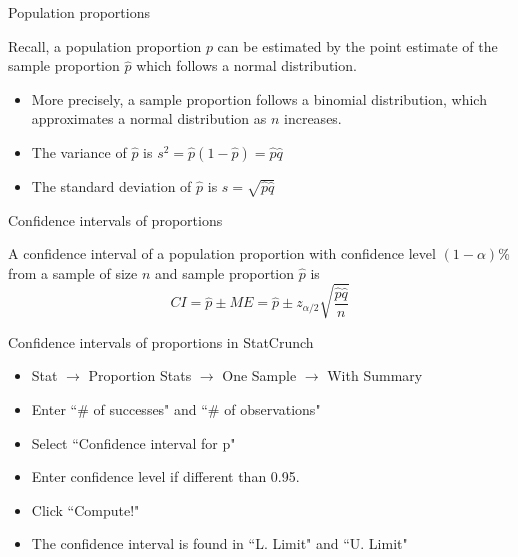 \documentclass[xcolor=table, handout]{beamer}
\begin{document}
\begin{frame}{Population proportions}
\begin{block}{}
\large
Recall, a population proportion $p$ can be estimated by the point estimate of the sample proportion $\hat p$ which follows a normal distribution.
\begin{itemize}
\pause\item More precisely, a sample proportion follows a binomial distribution, which approximates a normal distribution as $n$ increases.
\pause\item The variance of $\hat p$ is $s^2 = \hat p (1-\hat p) = \hat p \hat q$
\pause\item The standard deviation of $\hat p$ is $s = \sqrt{\hat p \hat q}$
\end{itemize}
\end{block}
\end{frame}

\begin{frame}{Confidence intervals of proportions}
\begin{block}{}
\large
A confidence interval of a population proportion with confidence level $(1-\alpha)$\% from a sample of size $n$ and sample proportion $\hat p$ is
\[CI = \hat p \pm ME = \hat p \pm z_{\alpha/2} \sqrt{\frac {\hat p \hat q}{n}}\]
\end{block}
\end{frame}

\begin{frame}{Confidence intervals of proportions in StatCrunch}
\begin{block}{}
\begin{itemize}
\item Stat $\to$ Proportion Stats $\to$ One Sample $\to$ With Summary
\item Enter ``\# of successes" and ``\# of observations"
\item Select ``Confidence interval for p"
\item Enter confidence level if different than 0.95.
\item Click ``Compute!"
\item The confidence interval is found in ``L. Limit" and ``U. Limit"
\end{itemize}
\end{block}
\end{frame}
\end{document}
